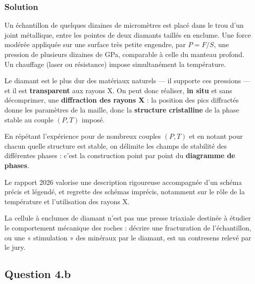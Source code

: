 \documentclass[11pt,a4paper]{article}
\begin{document}
\hypertarget{solution-9}{%
\subsubsection{Solution}\label{solution-9}}

Un échantillon de quelques dizaines de micromètres est placé dans le trou d'un joint métallique, entre les pointes de deux diamants taillés en enclume. Une force modérée appliquée sur une surface très petite engendre, par \(P = F/S\), une pression de plusieurs dizaines de GPa, comparable à celle du manteau profond. Un chauffage (laser ou résistance) impose simultanément la température.

Le diamant est le plus dur des matériaux naturels --- il supporte ces pressions --- et il est \textbf{transparent} aux rayons X. On peut donc réaliser, \textbf{in situ} et sans décomprimer, une \textbf{diffraction des rayons X} : la position des pics diffractés donne les paramètres de la maille, donc la \textbf{structure cristalline} de la phase stable au couple \((P, T)\) imposé.

En répétant l'expérience pour de nombreux couples \((P,T)\) et en notant pour chacun quelle structure est stable, on délimite les champs de stabilité des différentes phases : c'est la construction point par point du \textbf{diagramme de phases}.

\begin{jury}

Le rapport 2026 valorise une description rigoureuse accompagnée d'un schéma précis et légendé, et regrette des schémas imprécis, notamment sur le rôle de la température et l'utilisation des rayons X.

\end{jury}

\begin{piege}

La cellule à enclumes de diamant n'est pas une presse triaxiale destinée à étudier le comportement mécanique des roches : décrire une fracturation de l'échantillon, ou une « stimulation » des minéraux par le diamant, est un contresens relevé par le jury.

\end{piege}

\hypertarget{question-4.b}{%
\subsection{Question 4.b}\label{question-4.b}}
\end{document}
